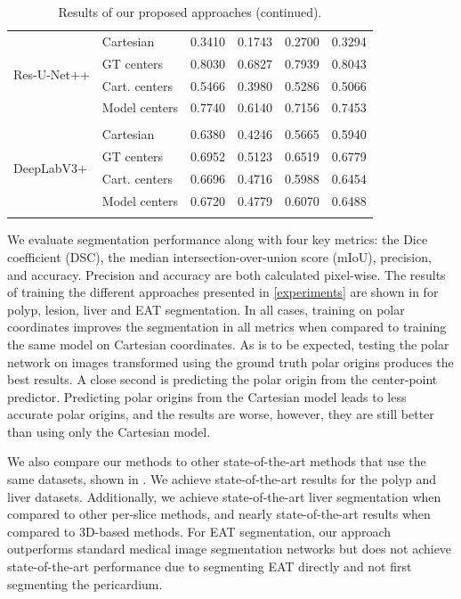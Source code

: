 \begin{table}
\begin{tabular}{l l c c c c}
 \multirow{4}{7em}{{Res-U-Net++}}
& Cartesian & 0.3410 & 0.1743 & 0.2700 & 0.3294 \\
& GT centers & 0.8030 & 0.6827 & 0.7939 & 0.8043 \\
& Cart. centers & 0.5466 & 0.3980 & 0.5286 & 0.5066 \\
& Model centers & 0.7740 & 0.6140 & 0.7156 & 0.7453 \\ [1ex]
\hline \\ [-1.5ex]

 \multirow{4}{7em}{{DeepLabV3+}}
& Cartesian & 0.6380 & 0.4246 & 0.5665 & 0.5940 \\
& GT centers & 0.6952 & 0.5123 & 0.6519 & 0.6779 \\
& Cart. centers & 0.6696 & 0.4716 & 0.5988 & 0.6454 \\
& Model centers & 0.6720 & 0.4779 & 0.6070 & 0.6488 \\ [1ex]
\hline \\ [-1.5ex]
\end{tabular}
\caption{Results of our proposed approaches (continued).}
\label{table:results}
\end{table}

We evaluate segmentation performance along with four key metrics: the Dice coefficient (DSC), the median intersection-over-union score (mIoU), precision, and accuracy. Precision and accuracy are both calculated pixel-wise. The results of training the different approaches presented in \ref{experiments} are shown in  for polyp, lesion, liver and EAT segmentation. In all cases, training on polar coordinates improves the segmentation in all metrics when compared to training the same model on Cartesian coordinates. As is to be expected, testing the polar network on images transformed using the ground truth polar origins produces the best results. A close second is predicting the polar origin from the center-point predictor. Predicting polar origins from the Cartesian model leads to less accurate polar origins, and the results are worse, however, they are still better than using only the Cartesian model.

We also compare our methods to other state-of-the-art methods that use the same datasets, shown in . We achieve state-of-the-art results for the polyp and liver datasets. Additionally, we achieve state-of-the-art liver segmentation when compared to other per-slice methods, and nearly state-of-the-art results when compared to 3D-based methods. For EAT segmentation, our approach outperforms standard medical image segmentation networks but does not achieve state-of-the-art performance due to segmenting EAT directly and not first segmenting the pericardium.

